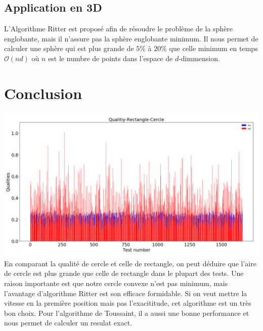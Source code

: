 \documentclass[14px]{article}
\begin{document}
\subsection{Application en 3D}
L'Algorithme Ritter est proposé afin de résoudre le problème de la sphère englobante, mais il n'assure pas la sphère englobante minimum. Il nous permet de calculer une sphère qui est plus grande de $5\%$ à $20\%$ que celle minimum en temps $\mathcal{O}(nd)$ où $n$ est le numbre de points dans l'espace de $d$-dimmension.

\section{Conclusion}

\includegraphics[width=\textwidth]{Quality-Rec-Cer.png}\\
En comparant la qualité de cercle et celle de rectangle, on peut déduire que l'aire de cercle est plus grande que celle de rectangle dans le plupart des tests. Une raison importante est que notre cercle convexe n'est pas minimum, mais l'avantage d'algorithme Ritter est son efficace formidable. Si on veut mettre la vitesse en la première position mais pas l'exacititude, cet algorithme est un très bon choix. Pour l'algorithme de Toussaint, il a aussi une bonne performance et nous permet de calculer un resulat exact.
\end{document}
